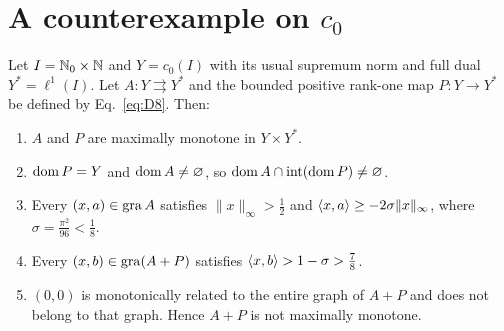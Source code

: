\section{A counterexample on $c_0$}
\label{sec:c0}
\label{sec:statements}
\renewcommand{\thetheorem}{C}
\begin{theorem}[A counterexample on $c_0$]\label{thm:C}
Let $I=\mathbb N_0\times\mathbb N$ and $Y=c_0(I)$ with its usual supremum norm and
full dual $Y^*=\ell^1(I)$. Let $A:Y\rightrightarrows Y^*$ and the bounded
positive rank-one map $P:Y\to Y^*$ be defined by Eq.~\eqref{eq:D8}.
Then:
\begin{enumerate}
\item $A$ and $P$ are maximally monotone in $Y\times Y^*$.
\item $\operatorname{dom} P=Y$ and $\operatorname{dom} A\ne\varnothing$, so
$\operatorname{dom} A\cap\operatorname{int}(\operatorname{dom} P)\ne\varnothing$.
\item Every $(x,a)\in\operatorname{gra} A$ satisfies $\|x\|_\infty>\frac{1}{2}$ and
$\langle x,a\rangle\ge-2\sigma\|x\|_\infty$, where $\sigma=\frac{\pi^2}{96}<\frac{1}{8}$.
\item Every $(x,b)\in\operatorname{gra}(A+P)$ satisfies
$\langle x,b\rangle>1-\sigma>\frac{7}{8}$.
\item $(0,0)$ is monotonically related to the entire graph of $A+P$ and
does not belong to that graph. Hence $A+P$ is not maximally monotone.
\end{enumerate}
\end{theorem}

